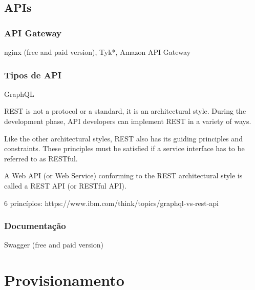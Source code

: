 \subsection{APIs}

\subsubsection{API Gateway}
nginx (free and paid version), Tyk*, Amazon API Gateway

\subsubsection{Tipos de API}

GraphQL 

REST is not a protocol or a standard, it is an architectural style. During the development phase, API developers can implement REST in a variety of ways.

Like the other architectural styles, REST also has its guiding principles and constraints. These principles must be satisfied if a service interface has to be referred to as RESTful.

A Web API (or Web Service) conforming to the REST architectural style is called a REST API (or RESTful API). 

6 princípios: https://www.ibm.com/think/topics/graphql-vs-rest-api

\subsubsection{Documentação}
Swagger (free and paid version)


\section{Provisionamento}

